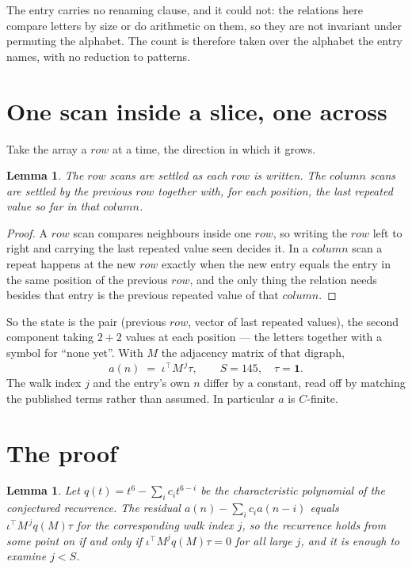 \documentclass[11pt,a4paper]{article}
\theoremstyle{plain}
\newtheorem{lemma}[theorem]{Lemma}
\theoremstyle{definition}
\begin{document}
The entry carries no renaming clause, and it could not: the relations here compare letters by
size or do arithmetic on them, so they are not invariant under permuting the alphabet. The
count is therefore taken over the alphabet the entry names, with no reduction to patterns.

\section{One scan inside a slice, one across}

Take the array a $row$ at a time, the direction in which it grows.

\begin{lemma}\label{lem:state}
The $row$ scans are settled as each $row$ is written. The $column$ scans are
settled by the previous $row$ together with, for each position, the last repeated value
so far in that $column$.
\end{lemma}

\begin{proof}
A $row$ scan compares neighbours inside one $row$, so writing the
$row$ left to right and carrying the last repeated value seen decides it. In a
$column$ scan a repeat happens at the new $row$ exactly when the new entry equals the
entry in the same position of the previous $row$, and the only thing the relation needs
besides that entry is the previous repeated value of that $column$.
\end{proof}

So the state is the pair (previous $row$, vector of last repeated values), the second
component taking $2+2$ values at each position --- the letters together with a symbol for
``none yet''. With $M$ the adjacency matrix of that digraph,
\[
a(n)\;=\;\iota^{\!\top}M^{\,j}\tau ,\qquad S=145,\quad\tau=\mathbf{1} .
\]
The walk index $j$ and the entry's own $n$ differ by a constant, read off by matching the
published terms rather than assumed. In particular $a$ is $C$-finite.

\section{The proof}

\begin{lemma}\label{lem:crit}
Let $q(t)=t^{6}-\sum_i c_it^{6-i}$ be the characteristic polynomial of the
conjectured recurrence. The residual $a(n)-\sum_ic_ia(n-i)$ equals
$\iota^{\!\top}M^{\,j}q(M)\tau$ for the corresponding walk index $j$, so the recurrence
holds from some point on if and only if $\iota^{\!\top}M^{j}q(M)\tau=0$ for all large $j$,
and it is enough to examine $j<S$.
\end{lemma}
\end{document}
